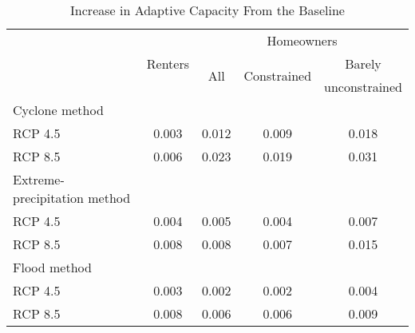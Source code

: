 \begin{table}[H] 
\singlespace 
\center 
\caption{Increase in Adaptive Capacity From the Baseline} \label{tab:adapt_cc}
\vspace{-.1in} 
\begin{tabular}{l c c c c}\hline 
\hline 
 &  & \multicolumn{3}{c}{Homeowners}\\  \cline{3-5} 	& Renters &  \multirow{2}{*}{All} & \multirow{2}{*}{Constrained} &  Barely  \\[-1.25ex] 
 	& &  & &    unconstrained  \\ 
\hline 
Cyclone method \\ 
\hspace{1em} RCP 4.5  &    0.003 &    0.012  &    0.009 &    0.018     \\\hspace{1em} RCP 8.5  &    0.006 &    0.023  &    0.019 &    0.031      \\Extreme-precipitation method \\ 
\hspace{1em} RCP 4.5   &    0.004 &    0.005  &    0.004 &    0.007   \\\hspace{1em} RCP 8.5  &    0.008 &    0.008  &    0.007 &    0.015  \\Flood method \\ 
\hspace{1em} RCP 4.5  &    0.003 &    0.002  &    0.002 &    0.004    \\\hspace{1em} RCP 8.5   &    0.008 &    0.006  &    0.006 &    0.009    \\\hline 
\end{tabular}
\end{table} 
